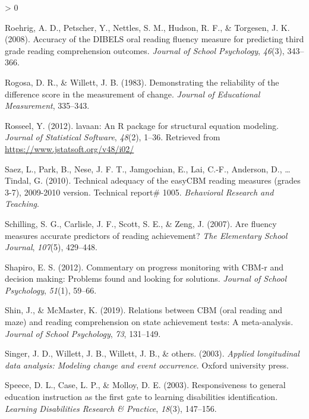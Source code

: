 \documentclass[
  english,
  man, fleqn, noextraspace]{apa6}
\newlength{\cslhangindent}
\newenvironment{CSLReferences}[2] %
 {%
  \setlength{\parindent}{0pt}
  \ifodd #1 \everypar{\setlength{\hangindent}{\cslhangindent}}\ignorespaces\fi
  \ifnum #2 > 0
  \setlength{\parskip}{#2\baselineskip}
  \fi
 }%
 {}
\begin{document}
\begin{CSLReferences}{1}{0}
\leavevmode\hypertarget{ref-roehrig2008}{}%
Roehrig, A. D., Petscher, Y., Nettles, S. M., Hudson, R. F., \& Torgesen, J. K. (2008). Accuracy of the DIBELS oral reading fluency measure for predicting third grade reading comprehension outcomes. \emph{Journal of School Psychology}, \emph{46}(3), 343--366.

\leavevmode\hypertarget{ref-rogosaetal1983}{}%
Rogosa, D. R., \& Willett, J. B. (1983). Demonstrating the reliability of the difference score in the measurement of change. \emph{Journal of Educational Measurement}, 335--343.

\leavevmode\hypertarget{ref-R-lavaan}{}%
Rosseel, Y. (2012). {lavaan}: An {R} package for structural equation modeling. \emph{Journal of Statistical Software}, \emph{48}(2), 1--36. Retrieved from \url{https://www.jstatsoft.org/v48/i02/}

\leavevmode\hypertarget{ref-saez2010tech}{}%
Saez, L., Park, B., Nese, J. F. T., Jamgochian, E., Lai, C.-F., Anderson, D., \ldots{} Tindal, G. (2010). Technical adequacy of the easyCBM reading measures (grades 3-7), 2009-2010 version. Technical report\# 1005. \emph{Behavioral Research and Teaching}.

\leavevmode\hypertarget{ref-schilling2007}{}%
Schilling, S. G., Carlisle, J. F., Scott, S. E., \& Zeng, J. (2007). Are fluency measures accurate predictors of reading achievement? \emph{The Elementary School Journal}, \emph{107}(5), 429--448.

\leavevmode\hypertarget{ref-shapiro2012}{}%
Shapiro, E. S. (2012). Commentary on progress monitoring with CBM-r and decision making: Problems found and looking for solutions. \emph{Journal of School Psychology}, \emph{51}(1), 59--66.

\leavevmode\hypertarget{ref-shin2019}{}%
Shin, J., \& McMaster, K. (2019). Relations between CBM (oral reading and maze) and reading comprehension on state achievement tests: A meta-analysis. \emph{Journal of School Psychology}, \emph{73}, 131--149.

\leavevmode\hypertarget{ref-singerwillett2003}{}%
Singer, J. D., Willett, J. B., Willett, J. B., \& others. (2003). \emph{Applied longitudinal data analysis: Modeling change and event occurrence}. Oxford university press.

\leavevmode\hypertarget{ref-speece2003}{}%
Speece, D. L., Case, L. P., \& Molloy, D. E. (2003). Responsiveness to general education instruction as the first gate to learning disabilities identification. \emph{Learning Disabilities Research \& Practice}, \emph{18}(3), 147--156.


\end{CSLReferences}
\end{document}
